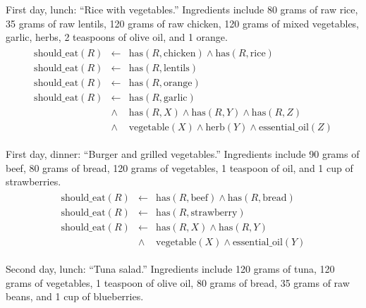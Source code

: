 \begin{prescriptions}
  \item First day, lunch: ``Rice with vegetables.'' Ingredients include 80 grams of raw rice, 35 grams of raw lentils, 120 grams of raw chicken, 120 grams of mixed vegetables, garlic, herbs, 2 teaspoons of olive oil, and 1 orange.
  \begin{align*}
    \begin{array}{rcl}
    \text{should\_eat}(R) & \leftarrow & \text{has}(R, \text{chicken}) \land \text{has}(R, \text{rice}) \\
    \text{should\_eat}(R) & \leftarrow & \text{has}(R, \text{lentils}) \\
    \text{should\_eat}(R) & \leftarrow & \text{has}(R, \text{orange}) \\
    \text{should\_eat}(R) & \leftarrow & \text{has}(R, \text{garlic})\\
                          & \land & \text{has}(R, X) \land \text{has}(R, Y) \land \text{has}(R, Z)\\
                          & \land & \text{vegetable}(X) \land \text{herb}(Y) \land \text{essential\_oil}(Z)
    \end{array}
  \end{align*}
  \item First day, dinner: ``Burger and grilled vegetables.'' Ingredients include 90 grams of beef, 80 grams of bread, 120 grams of vegetables, 1 teaspoon of oil, and 1 cup of strawberries.
  \begin{align*}
    \begin{array}{rcl}
      \text{should\_eat}(R) &\leftarrow& \text{has}(R, \text{beef}) \land \text{has}(R, \text{bread}) \\
      \text{should\_eat}(R) &\leftarrow& \text{has}(R, \text{strawberry}) \\
      \text{should\_eat}(R) &\leftarrow& \text{has}(R, X) \land \text{has}(R, Y) \\
                            &\land& \text{vegetable}(X) \land \text{essential\_oil}(Y)
    \end{array}
  \end{align*}
  \item Second day, lunch: ``Tuna salad.'' Ingredients include 120 grams of tuna, 120 grams of vegetables, 1 teaspoon of olive oil, 80 grams of bread, 35 grams of raw beans, and 1 cup of blueberries.
  \begin{align*}
    \begin{array}{rcl}

\end{array}
\end{align*}
\end{prescriptions}
